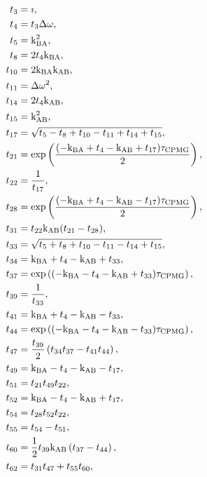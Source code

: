 \begin{latexonly}
\begin{subequations}
\renewcommand{\theequation}{\theparentequation .\arabic{equation}}
\begin{align}
      t_{3} &= \imath, \\
      t_{4} &= t_{3} \dw, \\
      t_{5} &= \kBA^2, \\
      t_{8} &= 2 t_{4} \kBA, \\
     t_{10} &= 2 \kBA \kAB, \\
     t_{11} &= \dw^2, \\
     t_{14} &= 2 t_{4} \kAB, \\
     t_{15} &= \kAB^2, \\
     t_{17} &= \sqrt{t_{5} - t_{8} + t_{10} - t_{11} + t_{14} + t_{15}}, \\
     t_{21} &= \exp \left(\frac{(-\kBA + t_{4} - \kAB + t_{17}) \taucpmg}{2} \right), \\
     t_{22} &= \frac{1}{t_{17}}, \\
     t_{28} &= \exp \left(\frac{(-\kBA + t_{4} - \kAB - t_{17}) \taucpmg}{2} \right), \\
     t_{31} &= t_{22} \kAB (t_{21} - t_{28}), \\
     t_{33} &= \sqrt{t_{5} + t_{8} + t_{10} - t_{11} - t_{14} + t_{15}}, \\
     t_{34} &= \kBA + t_{4} - \kAB + t_{33}, \\
     t_{37} &= \exp \left((-\kBA - t_{4} - \kAB + t_{33}) \taucpmg \right), \\
     t_{39} &= \frac{1}{t_{33}}, \\
     t_{41} &= \kBA + t_{4} - \kAB - t_{33}, \\
     t_{44} &= \exp \left((-\kBA - t_{4} - \kAB - t_{33}) \taucpmg \right), \\
     t_{47} &= \frac{t_{39}}{2} \left(t_{34} t_{37} - t_{41} t_{44} \right), \\
     t_{49} &= \kBA - t_{4} - \kAB - t_{17}, \\
     t_{51} &= t_{21} t_{49} t_{22}, \\
     t_{52} &= \kBA - t_{4} - \kAB + t_{17}, \\
     t_{54} &= t_{28} t_{52} t_{22}, \\
     t_{55} &= t_{54} - t_{51}, \\
     t_{60} &= \frac{1}{2} t_{39} \kAB \left(t_{37} - t_{44} \right), \\
     t_{62} &= t_{31} t_{47} + t_{55} t_{60}, \\

\end{align}
\end{subequations}
\end{latexonly}

